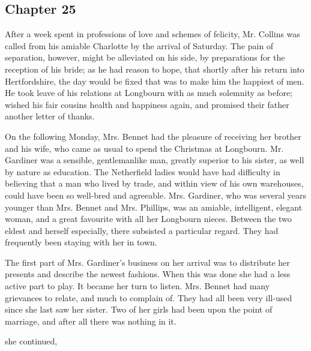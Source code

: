 \subsection[chapter-25]{\useURL[url25][][][]\from[url25] Chapter 25}

After a week spent in professions of love and schemes of felicity, Mr. Collins was called from his amiable Charlotte by the arrival of Saturday. The pain of separation, however, might be alleviated on his side, by preparations for the reception of his bride; as he had reason to hope, that shortly after his return into Hertfordshire, the day would be fixed that was to make him the happiest of men. He took leave of his relations at Longbourn with as much solemnity as before; wished his fair cousins health and happiness again, and promised their father another letter of thanks.

On the following Monday, Mrs. Bennet had the pleasure of receiving her brother and his wife, who came as usual to spend the Christmas at Longbourn. Mr. Gardiner was a sensible, gentlemanlike man, greatly superior to his sister, as well by nature as education. The Netherfield ladies would have had difficulty in believing that a man who lived by trade, and within view of his own warehouses, could have been so well-bred and agreeable. Mrs. Gardiner, who was several years younger than Mrs. Bennet and Mrs. Phillips, was an amiable, intelligent, elegant woman, and a great favourite with all her Longbourn nieces. Between the two eldest and herself especially, there subsisted a particular regard. They had frequently been staying with her in town.

The first part of Mrs. Gardiner's business on her arrival was to distribute her presents and describe the newest fashions. When this was done she had a less active part to play. It became her turn to listen. Mrs. Bennet had many grievances to relate, and much to complain of. They had all been very ill-used since she last saw her sister. Two of her girls had been upon the point of marriage, and after all there was nothing in it.

 she continued, 

